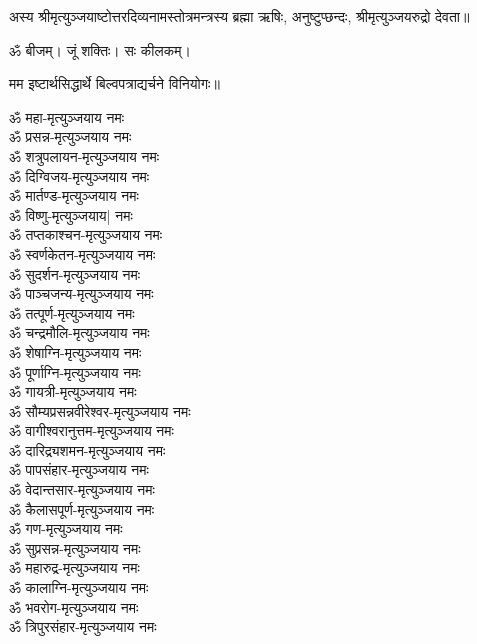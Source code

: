 

अस्य श्रीमृत्युञ्जयाष्टोत्तरदिव्यनामस्तोत्रमन्त्रस्य ब्रह्मा ऋषिः, अनुष्टुप्छन्दः, श्रीमृत्युञ्जयरुद्रो देवता॥ 

ॐ बीजम्। जूं शक्तिः। सः कीलकम्। 

मम इष्टार्थसिद्धार्थे बिल्वपत्राद्यर्चने विनियोगः॥ 

\begin{multicols}{2}
\begin{flushleft}
ॐ महा-मृत्युञ्जयाय नमः\\
ॐ प्रसन्न-मृत्युञ्जयाय नमः\\
ॐ शत्रुपलायन-मृत्युञ्जयाय नमः\\
ॐ दिग्विजय-मृत्युञ्जयाय नमः\\
ॐ मार्तण्ड-मृत्युञ्जयाय नमः\\
ॐ विष्णु-मृत्युञ्जयाय| नमः\\
ॐ तप्तकाश्चन-मृत्युञ्जयाय नमः\\
ॐ स्वर्णकेतन-मृत्युञ्जयाय नमः\\
ॐ सुदर्शन-मृत्युञ्जयाय नमः\\
ॐ पाञ्चजन्य-मृत्युञ्जयाय नमः\hfill{}\\
ॐ तत्पूर्ण-मृत्युञ्जयाय नमः\\
ॐ चन्द्रमौलि-मृत्युञ्जयाय नमः\\
ॐ शेषाग्नि-मृत्युञ्जयाय नमः\\
ॐ पूर्णाग्नि-मृत्युञ्जयाय नमः\\
ॐ गायत्री-मृत्युञ्जयाय नमः\\
ॐ सौम्यप्रसन्नवीरेश्वर-मृत्युञ्जयाय नमः\\
ॐ वागीश्वरानुत्तम-मृत्युञ्जयाय नमः\\
ॐ दारिद्र्यशमन-मृत्युञ्जयाय नमः\\
ॐ पापसंहार-मृत्युञ्जयाय नमः\\
ॐ वेदान्तसार-मृत्युञ्जयाय नमः\hfill{}\\
ॐ कैलासपूर्ण-मृत्युञ्जयाय नमः\\
ॐ गण-मृत्युञ्जयाय नमः\\
ॐ सुप्रसन्न-मृत्युञ्जयाय नमः\\
ॐ महारुद्र-मृत्युञ्जयाय नमः\\
ॐ कालाग्नि-मृत्युञ्जयाय नमः\\
ॐ भवरोग-मृत्युञ्जयाय नमः\\
ॐ त्रिपुरसंहार-मृत्युञ्जयाय नमः\\

\end{flushleft}
\end{multicols}
